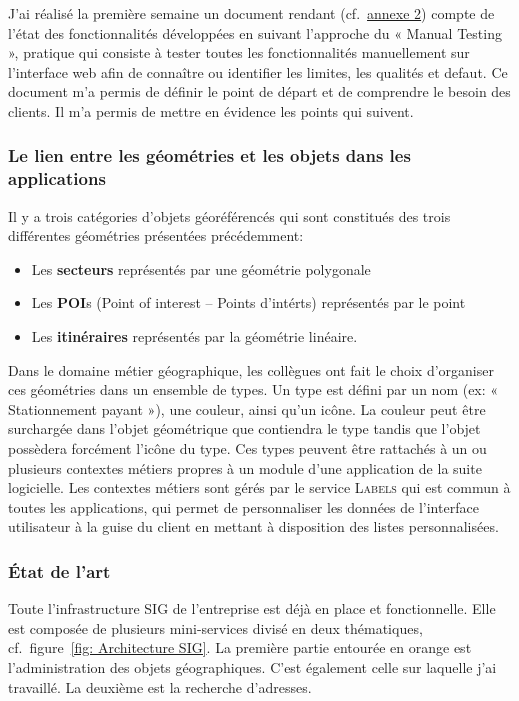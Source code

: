 \documentclass{rapportUHA40}
\begin{document}
J’ai réalisé la première semaine un document rendant (cf.\
\hyperlink{ANNEX2}{annexe 2}) compte de l’état des fonctionnalités développées
en suivant l’approche du « Manual Testing », pratique qui consiste à tester
toutes les fonctionnalités manuellement sur l’interface web afin de connaître
ou identifier les limites, les qualités et defaut. Ce document m’a permis de
définir le point de départ et de comprendre le besoin des clients. Il m'a
permis de mettre en évidence les points qui suivent.

\subsubsection{Le lien entre les géométries et les objets dans les applications}
Il y a trois catégories d'objets géoréférencés qui sont constitués des trois
différentes géométries présentées précédemment:
\begin{itemize}
  \item Les \textbf{secteurs} représentés par une géométrie polygonale
  \item Les \textbf{POI}s (Point of interest – Points d'intérts) représentés par le
        point
  \item Les \textbf{itinéraires} représentés par la géométrie linéaire. \\
\end{itemize}

Dans le domaine métier géographique, les collègues ont fait le choix
d'organiser ces géométries dans un ensemble de types. Un type est défini par un
nom (ex: « Stationnement payant »), une couleur, ainsi qu'un icône. La couleur
peut être surchargée dans l'objet géométrique que contiendra le type tandis que
l'objet possèdera forcément l'icône du type. Ces types peuvent être rattachés à
un ou plusieurs contextes métiers propres à un module d'une application de la
suite logicielle. Les contextes métiers sont gérés par le service
\textsc{Labels} qui est commun à toutes les applications, qui permet de
personnaliser les données de l'interface utilisateur à la guise du client en
mettant à disposition des listes personnalisées.

\subsubsection{État de l'art}
Toute l'infrastructure SIG de l'entreprise est déjà en place et fonctionnelle.
Elle est composée de plusieurs mini-services divisé en deux thématiques, cf.\
figure~\ref{fig: Architecture SIG}. La première partie entourée en orange est
l'administration des objets géographiques. C'est également celle sur laquelle
j'ai travaillé. La deuxième est la recherche d'adresses.
\end{document}
